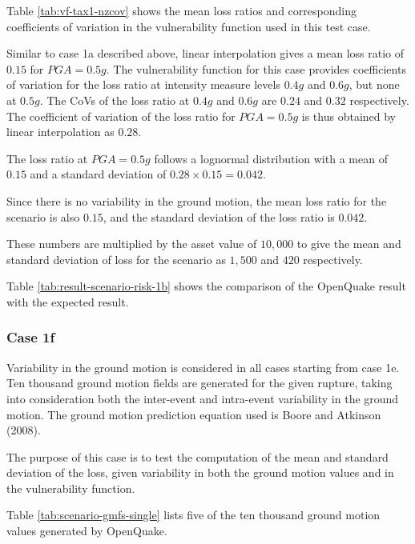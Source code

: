 Table \ref{tab:vf-tax1-nzcov} shows the mean loss ratios and corresponding coefficients of variation in the vulnerability function used in this test case.

Similar to case 1a described above, linear interpolation gives a mean loss ratio of $0.15$ for $PGA = 0.5 g$. The vulnerability function for this case provides coefficients of variation for the loss ratio at intensity measure levels $0.4 g$ and $0.6 g$, but none at $0.5 g$. The CoVs of the loss ratio at $0.4 g$ and $0.6 g$ are $0.24$ and $0.32$ respectively. The coefficient of variation of the loss ratio for $PGA = 0.5 g$ is thus obtained by linear interpolation as $0.28$.

The loss ratio at $PGA = 0.5 g$ follows a lognormal distribution with a mean of $0.15$ and a standard deviation of $0.28 \times 0.15 = 0.042$.

Since there is no variability in the ground motion, the mean loss ratio for the scenario is also $0.15$, and the standard deviation of the loss ratio is $0.042$.

These numbers are multiplied by the asset value of $10,000$ to give the mean and standard deviation of loss for the scenario as $1,500$ and $420$ respectively.



Table \ref{tab:result-scenario-risk-1b} shows the comparison of the OpenQuake result with the expected result.

\subsubsection{Case 1f}
Variability in the ground motion is considered in all cases starting from case 1e. Ten thousand ground motion fields are generated for the given rupture, taking into consideration both the inter-event and intra-event variability in the ground motion. The ground motion prediction equation used is Boore and Atkinson (2008).

The purpose of this case is to test the computation of the mean and standard deviation of the loss, given variability in both the ground motion values and in the vulnerability function.



Table \ref{tab:scenario-gmfs-single} lists five of the ten thousand ground motion values generated by OpenQuake.

